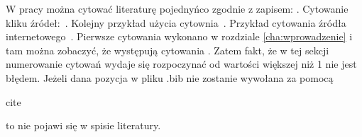 W pracy można cytować literaturę pojednyńco zgodnie z zapisem: \cite{ARM06}. Cytowanie kliku źródeł:~\cite{ARM06,BuDo03,BuDoVa03,PeDa04}. Kolejny przykład użycia cytownia~\cite{Dil00, gonzalez2017}. Przykład cytowania źródła internetowego~\cite{example2024}.
Pierwsze cytowania wykonano w rozdziale \ref{cha:wprowadzenie} i tam można zobaczyć, że występują cytowania \cite{Dil00,Lam92}.  Zatem fakt, że w tej sekcji numerowanie cytowań wydaje się rozpoczynać od wartości większej niż 1 nie jest błędem. Jeżeli dana pozycja w pliku .bib nie zostanie wywołana za pomocą \begin{it} cite \end{it} to nie pojawi się w spisie literatury.

